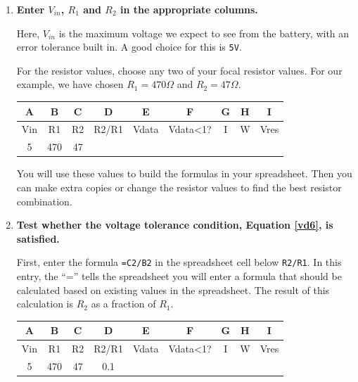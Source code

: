 \begin{enumerate}
	\item \textbf{Enter $V_{in}$, $R_1$ and $R_2$ in the appropriate columns.}

	Here, $V_{in}$ is the maximum voltage we expect to see from the battery, with an error tolerance built in.
	A good choice for this is \texttt{5V}.

	\smallskip
	For the resistor values, choose any two of your focal resistor values.
	For our example, we have chosen $R_1=470\Omega$ and $R_2=47\Omega$.
	\begin{table}[H]
		\centering \begin{small}
		\begin{tabular}{|c|c|c|c|c|c|c|c|c|}
			\hline
			\textbf{A}  & \textbf{B} & \textbf{C} & \textbf{D} & \textbf{E} & \textbf{F} & \textbf{G} & \textbf{H} & \textbf{I} \\
			\hline
			Vin  & R1 & R2 & R2/R1 & Vdata & Vdata<1? & I & W & Vres \\
			\hline
			5 & 470  & 47 &  &  &  &  &  &  \\
			\hline
		\end{tabular}
	\end{small}
	\end{table}
	You will use these values to build the formulas in your spreadsheet.
	Then you can make extra copies or change the resistor values to find the best resistor combination.

	\item \textbf{Test whether the voltage tolerance condition, Equation \ref{vd6}, is satisfied.}

	First, enter the formula \lstinline{=C2/B2} in the spreadsheet cell below \texttt{R2/R1}.
	In this entry, the ``='' tells the spreadsheet you will enter a formula that should be calculated based on existing values in the spreadsheet.
	The result of this calculation is $R_2$ as a fraction of $R_1$.

	\begin{table}[H]
	\centering \begin{small}
	\begin{tabular}{|c|c|c|c|c|c|c|c|c|}
		\hline
		\textbf{A}  & \textbf{B} & \textbf{C} & \textbf{D} & \textbf{E} & \textbf{F} & \textbf{G} & \textbf{H} & \textbf{I} \\
		\hline
		Vin  & R1 & R2 & R2/R1 & Vdata & Vdata<1? & I & W & Vres \\
		\hline
		5 & 470  & 47 & 0.1 &  &  &  &  &  \\
		\hline
	\end{tabular}
	\end{small}
	\end{table}


\end{enumerate}
